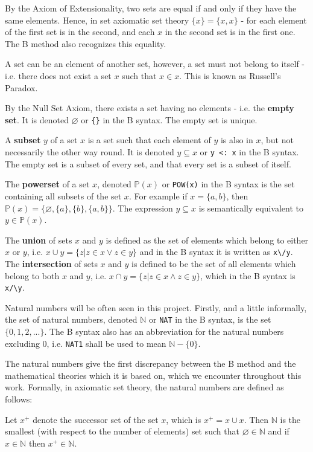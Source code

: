 \documentclass[12pt,journal,duplex]{IEEEtran}
\begin{document}
	By the Axiom of Extensionality, two sets are equal if and only if they have the same elements. Hence, in set axiomatic set theory $\{x\} = \{x, x\}$ - for each element of the first set is in the second, and each $x$ in the second set is in the first one. The B method also recognizes this equality\cite{b-method}.

	A set can be an element of another set, however, a set must not belong to itself - i.e. there does not exist a set $x$ such that $x \in x$. This is known as Russell's Paradox.

	By the Null Set Axiom, there exists a set having no elements - i.e. the \textbf{empty set}. It is denoted $\varnothing$ or \texttt{\{\}} in the B syntax. The empty set is unique.

	A \textbf{subset} $y$ of a set $x$ is a set such that each element of $y$ is also in $x$, but not necessarily the other way round. It is denoted $y \subseteq x$ or \texttt{y <: x} in the B syntax. The empty set is a subset of every set, and that every set is a subset of itself.

	The \textbf{powerset} of a set $x$, denoted $\mathbb{P}(x)$ or \texttt{POW(x)} in the B syntax is the set containing all subsets of the set $x$. For example if $x = \{a,b\}$, then $\mathbb{P}(x) = \{\varnothing, \{a\}, \{b\}, \{a,b\}\}$. The expression $y \subseteq x$ is semantically equivalent to $y \in \mathbb{P}(x)$.

	The \textbf{union} of sets $x$ and $y$ is defined as the set of elements which belong to either $x$ or $y$, i.e. $x \cup y = \{z| z \in x \vee z \in y\}$ and in the B syntax it is written as \verb|x\/y|. The \textbf{intersection} of sets $x$ and $y$ is defined to be the set of all elements which belong to both $x$ and $y$, i.e. $x \cap y = \{z | z \in x \wedge z \in y \}$, which in the B syntax is \verb|x/\y|.

	Natural numbers will be often seen in this project. Firstly, and a little informally, the set of natural numbers, denoted $\mathbb{N}$ or \texttt{NAT} in the B syntax, is the set $\{0,1,2, ...\}$. The B syntax also has an abbreviation for the natural numbers excluding 0, i.e. \texttt{NAT1} shall be used to mean $\mathbb{N}-\{0\}$.

	The natural numbers give the first discrepancy between the B method and the mathematical theories which it is based on, which we encounter throughout this work. Formally, in axiomatic set theory, the natural numbers are defined as follows:

	Let $x^+$ denote the successor set of the set $x$, which is $x^+ = x \cup {x}$. Then $\mathbb{N}$ is the smallest (with respect to the number of elements) set such that $\varnothing \in \mathbb{N}$ and if $x \in \mathbb{N}$ then $x^+ \in \mathbb{N}$.
\end{document}
